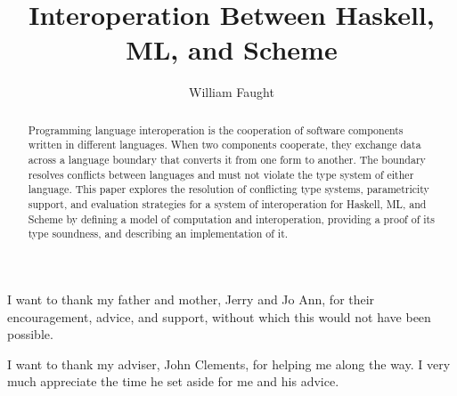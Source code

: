 \documentclass[12pt]{ucthesis}
\begin{document}
\title{Interoperation Between Haskell, ML, and Scheme}
\author{William Faught}
\maketitle

\begin{frontmatter}

\copyrightpage
\approvalpage
\begin{abstract}
Programming language interoperation is the cooperation of software components written in different languages.  When two components cooperate, they exchange data across a language boundary that converts it from one form to another.  The boundary resolves conflicts between languages and must not violate the type system of either language.  This paper explores the resolution of conflicting type systems, parametricity support, and evaluation strategies for a system of interoperation for Haskell, ML, and Scheme by defining a model of computation and interoperation, providing a proof of its type soundness, and describing an implementation of it.
\end{abstract}
\begin{acknowledgements}
\indent\indent I want to thank my father and mother, Jerry and Jo Ann, for their encouragement, advice, and support, without which this would not have been possible.

I want to thank my adviser, John Clements, for helping me along the way.  I very much appreciate the time he set aside for me and his advice.
\end{acknowledgements}
\tableofcontents
\listoffigures

\end{frontmatter}

\pagestyle{plain}
\renewcommand{\baselinestretch}{1.66}









\clearpage


\end{document}
